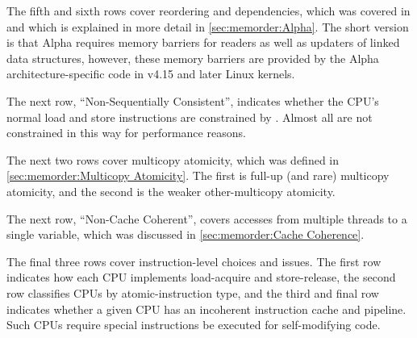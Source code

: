 The fifth and sixth rows cover reordering and dependencies,
which was covered in
and which is explained in more detail in
\cref{sec:memorder:Alpha}.
The short version is that Alpha requires memory barriers for readers
as well as updaters of linked data structures, however, these memory
barriers are provided by the Alpha architecture-specific code in
v4.15 and later Linux kernels.

The next row, ``Non-Sequentially Consistent'', indicates whether
the CPU's normal load and store instructions are constrained by
.
Almost all are not constrained in this way for performance reasons.

The next two rows cover multicopy atomicity, which was defined in
\cref{sec:memorder:Multicopy Atomicity}.
The first is full-up (and rare) multicopy atomicity, and the second is the
weaker other-multicopy atomicity.

The next row, ``Non-Cache Coherent'', covers accesses from multiple
threads to a single variable, which was discussed in
\cref{sec:memorder:Cache Coherence}.

The final three rows cover instruction-level choices and issues.
The first row indicates how each CPU implements load-acquire
and store-release, the second row classifies CPUs by atomic-instruction
type, and the third and final row
indicates whether a given CPU has an incoherent
instruction cache and pipeline.
Such CPUs require special instructions be executed for self-modifying
code.


